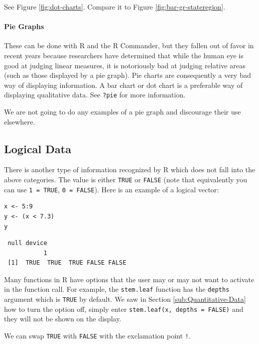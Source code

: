 \documentclass[captions=tableheading]{scrbook}
\begin{document}
\begin{example}
See Figure \ref{fig:dot-charts}. Compare it to Figure \ref{fig:bar-gr-stateregion}.

\end{example}

\paragraph*{Pie Graphs}
\label{par:Pie-Graphs}

These can be done with \textsf{R} and the \textsf{R} Commander, but they fallen out of favor in recent years because researchers have determined that while the human eye is good at judging linear measures, it is notoriously bad at judging relative areas (such as those displayed by a pie graph). Pie charts are consequently a very bad way of displaying information. A bar chart or dot chart is a preferable way of displaying qualitative data. See \texttt{?pie} for more information.

We are not going to do any examples of a pie graph and discourage their use elsewhere. 
\subsection{Logical Data}
\label{sec-3-1-5}

\label{sub:Logical-Data}

There is another type of information recognized by \textsf{R} which does not fall into the above categories. The value is either \texttt{TRUE} or \texttt{FALSE} (note that equivalently you can use \texttt{1 = TRUE}, \texttt{0 = FALSE}). Here is an example of a logical vector:


\begin{verbatim}
x <- 5:9
y <- (x < 7.3)
y
\end{verbatim}

\begin{verbatim}
 null device 
           1
 [1]  TRUE  TRUE  TRUE FALSE FALSE
\end{verbatim}

Many functions in \textsf{R} have options that the user may or may not want to activate in the function call. For example, the \texttt{stem.leaf} function has the \texttt{depths} argument which is \texttt{TRUE} by default. We saw in Section \ref{sub:Quantitative-Data} how to turn the option off, simply enter \texttt{stem.leaf(x, depths = FALSE)} and they will not be shown on the display.

We can swap \texttt{TRUE} with \texttt{FALSE} with the exclamation point \texttt{!}.
\end{document}
